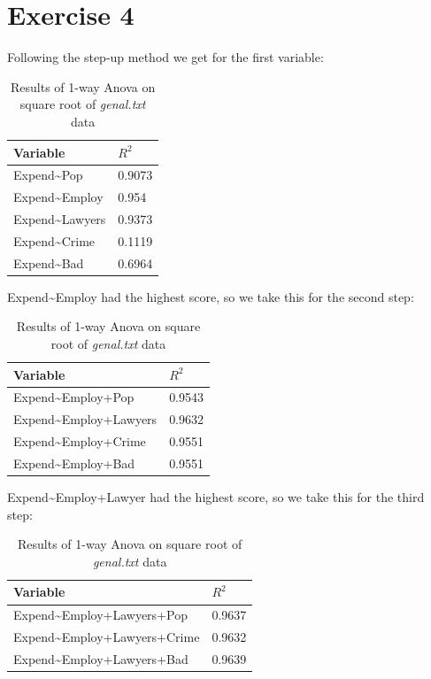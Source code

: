 \documentclass{article}
\begin{document}
  \section*{Exercise 4}
    Following the step-up method we get for the first variable:
    \begin{table}[H]
    \begin{center}
    \begin{tabular}{l|l}
        Variable & $R^2$ \\
        \hline 
        Expend\textasciitilde Pop & 0.9073 \\
        Expend\textasciitilde Employ & 0.954 \\
        Expend\textasciitilde Lawyers & 0.9373 \\
        Expend\textasciitilde Crime & 0.1119 \\
        Expend\textasciitilde Bad & 0.6964 \\
    \end{tabular}
    \caption{Results of 1-way Anova on square root of \textit{genal.txt} data}
    \label{table:step1}
    \end{center}
    \end{table}
    Expend\textasciitilde Employ had the highest score, so we take this for the second step:
    \begin{table}[H]
    \begin{center}
    \begin{tabular}{l|l}
        Variable & $R^2$ \\
        \hline 
        Expend\textasciitilde Employ+Pop & 0.9543 \\
        Expend\textasciitilde Employ+Lawyers & 0.9632 \\
        Expend\textasciitilde Employ+Crime & 0.9551 \\
        Expend\textasciitilde Employ+Bad & 0.9551 \\
    \end{tabular}
    \caption{Results of 1-way Anova on square root of \textit{genal.txt} data}
    \label{table:step2}
    \end{center}
    \end{table}
    Expend\textasciitilde Employ+Lawyer had the highest score, so we take this for the third step:
    \begin{table}[H]
    \begin{center}
    \begin{tabular}{l|l}
        Variable & $R^2$ \\
        \hline 
        Expend\textasciitilde Employ+Lawyers+Pop & 0.9637 \\
        Expend\textasciitilde Employ+Lawyers+Crime & 0.9632 \\
        Expend\textasciitilde Employ+Lawyers+Bad & 0.9639 \\
    \end{tabular}
    \caption{Results of 1-way Anova on square root of \textit{genal.txt} data}
    \label{table:step3}
    \end{center}
    \end{table}
\end{document}
